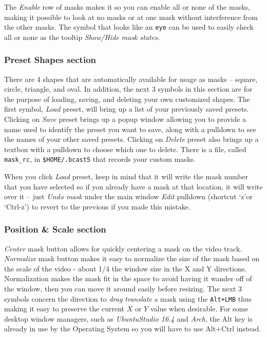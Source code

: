 The \textit{Enable} row of masks makes it so you can enable all or none of the masks, making it possible to look at no masks or at one mask without interference from the other masks. The symbol that looks like an \texttt{eye} can be used to easily check all or none as the tooltip \textit{Show/Hide mask states}.

\subsubsection*{Preset Shapes section}%
\label{ssub:preset_shape_section}

There are 4 shapes that are automatically available for usage as masks – square, circle, triangle, and oval.  In addition, the next 3 symbols in this section are for the purpose of loading, saving, and deleting your own customized shapes.  The first symbol, \textit{Load} preset, will bring up a list of your previously saved presets.  Clicking on \textit{Save} preset brings up a popup window allowing you to provide a name used to identify the preset you want to save, along with a pulldown to see the names of your other saved presets.   Clicking on \textit{Delete} preset also brings up a textbox with a pulldown to choose which one to delete.  There is a file, called \texttt{mask\_rc}, in \texttt{\$HOME/.bcast5} that records your custom masks.  

When you click \textit{Load} preset, keep in mind that it will write the mask number that you have selected so if you already have a mask at that location, it will write over it – just \textit{Undo mask} under the main window \textit{Edit} pulldown (shortcut `z'or `Ctrl-z') to revert to the previous if you made this mistake.

\subsubsection*{Position \& Scale section}%
\label{ssub:position_scale_section}

\textit{Center} mask button allows for quickly centering a mask on the video track. 
\textit{Normalize} mask button makes it easy to normalize the size of the mask based on the scale of the video - about 1/4 the window size in the X and Y 
directions.  Normalization makes the mask fit in the space to avoid having
it wander off of the window, then you can move it around easily before resizing.
The next 3 symbols concern the direction to \textit{drag translate} a mask using the \texttt{Alt+LMB} thus making it easy to preserve the current $X$ or $Y$ value when desirable.  For some desktop window managers,
such as \textit{UbuntuStudio 16.4} and \textit{Arch}, the Alt key is already in use by the Operating System
so you will have to use Alt+Ctrl instead.

